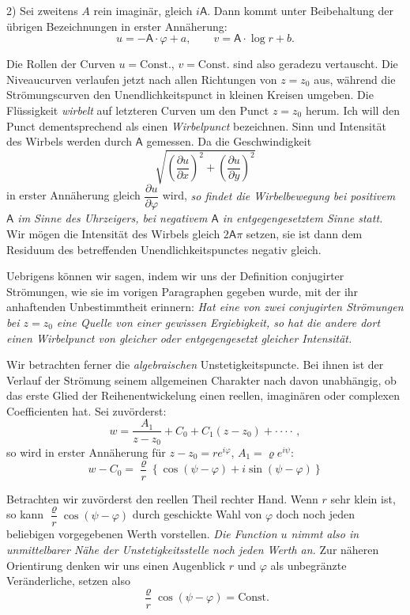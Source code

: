 \documentclass{article}
\begin{document}

2) Sei zweitens $A$ rein imaginär, gleich $i\mathsf{A}$. Dann kommt unter Beibehaltung der übrigen Bezeichnungen in erster Annäherung:
\[ u = -\mathsf{A} \cdot \varphi + a, \qquad v = \mathsf{A} \cdot \log r + b. \]

Die Rollen der Curven $u = \text{Const.}$, $v = \text{Const.}$ sind also geradezu vertauscht. Die Niveaucurven verlaufen jetzt nach allen Richtungen von $z = z_{0}$ aus, während die Strömungscurven den Unendlichkeitspunct in kleinen Kreisen umgeben. Die Flüssigkeit \emph{wirbelt} auf letzteren Curven um den Punct $z = z_{0}$ herum. Ich will den Punct dementsprechend als einen \emph{Wirbelpunct} bezeichnen. Sinn und Intensität des Wirbels werden durch $\mathsf{A}$ gemessen. Da die Geschwindigkeit
\[ \sqrt{\left(\frac{\partial u}{\partial x}\right)^{2} + \left(\frac{\partial u}{\partial y}\right)^{2}} \]
in erster Annäherung gleich $\dfrac{\partial u}{\partial \varphi}$ wird, \emph{so findet die Wirbelbewegung bei positivem $\mathsf{A}$ im Sinne des Uhrzeigers, bei negativem $\mathsf{A}$ in entgegengesetztem Sinne statt.} Wir mögen die Intensität des Wirbels gleich $2\mathsf{A}\pi$ setzen, sie ist dann dem Residuum des betreffenden Unendlichkeitspunctes negativ gleich.

Uebrigens können wir sagen, indem wir uns der Definition conjugirter Strömungen, wie sie im vorigen Paragraphen gegeben wurde, mit der ihr anhaftenden Unbestimmtheit erinnern: \emph{Hat eine von zwei conjugirten Strömungen bei $z = z_{0}$ eine Quelle von einer gewissen Ergiebigkeit, so hat die andere dort einen Wirbelpunct von gleicher oder entgegengesetzt gleicher Intensität.}

Wir betrachten ferner die \emph{algebraischen} Unstetigkeitspuncte. Bei ihnen ist der Verlauf der Strömung seinem allgemeinen Charakter nach davon unabhängig, ob das erste Glied der Reihenentwickelung einen reellen, imaginären oder complexen Coefficienten hat. Sei zuvörderst:
\[ w = \frac{A_{1}}{z - z_{0}} + C_{0} + C_{1} (z - z_{0}) + \cdot\cdot\cdot\cdot\,, \]
so wird in erster Annäherung für $z - z_{0} = re^{i\varphi}$, $A_{1} = \varrho e^{i\psi}$:
\[ w - C_{0} = \frac{\varrho}{r} \left\{ \cos (\psi - \varphi) + i \sin (\psi - \varphi) \right\} \]


Betrachten wir zuvörderst den reellen Theil rechter Hand. Wenn $r$ sehr klein ist, so kann $\dfrac{\varrho}{r} \cos (\psi - \varphi)$ durch geschickte Wahl von $\varphi$ doch noch jeden beliebigen vorgegebenen Werth vorstellen. \emph{Die Function $u$ nimmt also in unmittelbarer Nähe der Unstetigkeitsstelle noch jeden Werth an.} Zur näheren Orientirung denken wir uns einen Augenblick $r$ und $\varphi$ als unbegränzte Veränderliche, setzen also
\[ \frac{\varrho}{r} \cos (\psi - \varphi) = \text{Const.} \]
\end{document}
